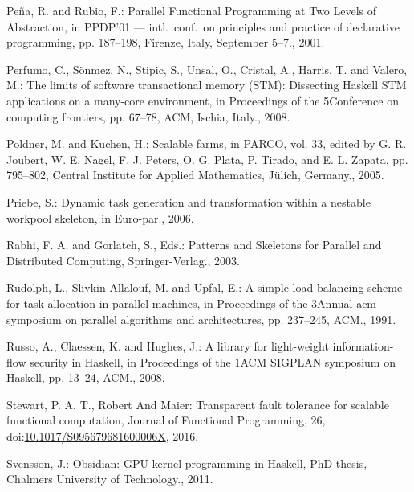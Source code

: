 \documentclass[paper=A4,twoside=true,openright,parskip=full,chapterprefix=true,headings=normal,bibliography=totoc,listof=totoc,titlepage=on,captions=tableabove,draft=false,british]{scrreprt}%
\begin{document}
\leavevmode\hypertarget{ref-Eden:PPDP01}{}%
Peña, R. and Rubio, F.: Parallel Functional Programming at Two Levels of
Abstraction, in PPDP'01 --- intl.~conf.~on principles and practice of
declarative programming, pp. 187--198, Firenze, Italy, September 5--7.,
2001.

\leavevmode\hypertarget{ref-Perfumo:2008:LST:1366230.1366241}{}%
Perfumo, C., Sönmez, N., Stipic, S., Unsal, O., Cristal, A., Harris, T.
and Valero, M.: The limits of software transactional memory (STM):
Dissecting Haskell STM applications on a many-core environment, in
Proceedings of the 5Conference on computing frontiers, pp. 67--78, ACM,
Ischia, Italy., 2008.

\leavevmode\hypertarget{ref-Kuchen05}{}%
Poldner, M. and Kuchen, H.: Scalable farms, in PARCO, vol. 33, edited by
G. R. Joubert, W. E. Nagel, F. J. Peters, O. G. Plata, P. Tirado, and E.
L. Zapata, pp. 795--802, Central Institute for Applied Mathematics,
Jülich, Germany., 2005.

\leavevmode\hypertarget{ref-WPEuropar06}{}%
Priebe, S.: Dynamic task generation and transformation within a nestable
workpool skeleton, in Euro-par., 2006.

\leavevmode\hypertarget{ref-SkeletonBook}{}%
Rabhi, F. A. and Gorlatch, S., Eds.: Patterns and Skeletons for Parallel
and Distributed Computing, Springer-Verlag., 2003.

\leavevmode\hypertarget{ref-Rudolph:1991:SLB:113379.113401}{}%
Rudolph, L., Slivkin-Allalouf, M. and Upfal, E.: A simple load balancing
scheme for task allocation in parallel machines, in Proceedings of the
3Annual acm symposium on parallel algorithms and architectures, pp.
237--245, ACM., 1991.

\leavevmode\hypertarget{ref-Russo:2008:LLI:1411286.1411289}{}%
Russo, A., Claessen, K. and Hughes, J.: A library for light-weight
information-flow security in Haskell, in Proceedings of the 1ACM SIGPLAN
symposium on Haskell, pp. 13--24, ACM., 2008.

\leavevmode\hypertarget{ref-stewart_maier_trinder_2016}{}%
Stewart, P. A. T., Robert And Maier: Transparent fault tolerance for
scalable functional computation, Journal of Functional Programming, 26,\\
doi:\href{https://doi.org/10.1017/S095679681600006X}{10.1017/S095679681600006X},
2016.

\leavevmode\hypertarget{ref-obsidian-phd}{}%
Svensson, J.: Obsidian: GPU kernel programming in Haskell, PhD thesis,
Chalmers University of Technology., 2011.
\end{document}
